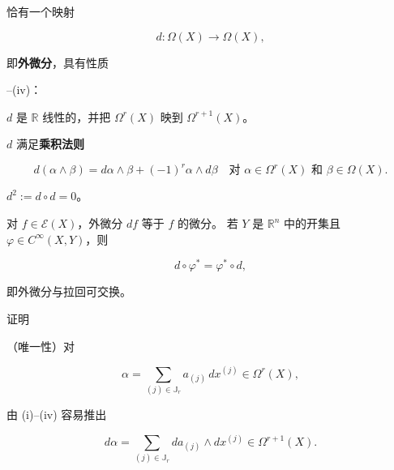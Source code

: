 \begin{theorem}

恰有一个映射

\[
d: \Omega(X) \to \Omega(X),
\]

即\textbf{外微分}，具有性质

\begin{subitems}
\item

–(iv)：

\begin{items}
\item

$ d $ 是 $ \mathbb{R} $ 线性的，并把 $ \Omega^{r}(X) $ 映到 $ \Omega^{r+1}(X) $。

\end{items}

\item

$ d $ 满足\textbf{乘积法则}

\[
d(\alpha \wedge \beta) = d\alpha \wedge \beta + (-1)^{r}\alpha \wedge d\beta \quad \text{对 } \alpha \in \Omega^{r}(X) \text{ 和 } \beta \in \Omega(X).
\]
\item

$ d^{2} := d \circ d = 0 $。

\item

对 $ f \in \mathcal{E}(X) $，外微分 $ df $ 等于 $ f $ 的微分。
若 $ Y $ 是 $ \mathbb{R}^{n} $ 中的开集且 $ \varphi \in C^{\infty}(X, Y) $，则

\begin{equation}
d \circ \varphi^{*} = \varphi^{*} \circ d,\tag{3.12}
\end{equation}

即外微分与拉回可交换。

\end{subitems}

证明

\begin{items}
\item

（唯一性）对

\begin{equation}
\alpha = \sum_{(j) \in \mathbb{J}_{r}} a_{(j)}\,dx^{(j)} \in \Omega^{r}(X),\tag{3.13}
\end{equation}

由 (i)–(iv) 容易推出

\begin{equation}
d\alpha = \sum_{(j) \in \mathbb{J}_{r}} da_{(j)} \wedge dx^{(j)} \in \Omega^{r+1}(X).\tag{3.14}
\end{equation}


\end{items}
\end{theorem}
